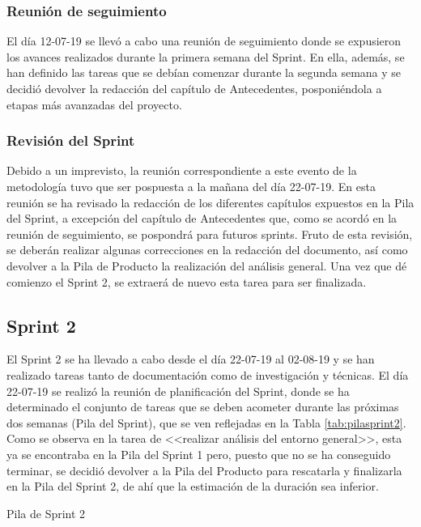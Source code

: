 \subsubsection{Reunión de seguimiento}
El día 12-07-19 se llevó a cabo una reunión de seguimiento donde se expusieron los avances realizados durante la primera semana del Sprint. En ella, además, se han definido las tareas que se debían comenzar durante la segunda semana y se decidió devolver la redacción del capítulo de Antecedentes, posponiéndola a etapas más avanzadas del proyecto.

\subsubsection{Revisión del Sprint}
Debido a un imprevisto, la reunión correspondiente a este evento de la metodología tuvo que ser pospuesta a la mañana del día 22-07-19. En esta reunión se ha revisado la redacción de los diferentes capítulos expuestos en la Pila del Sprint, a excepción del capítulo de Antecedentes que, como se acordó en la reunión de seguimiento, se pospondrá para futuros sprints. Fruto de esta revisión, se deberán realizar algunas correcciones en la redacción del documento, así como devolver a la Pila de Producto la realización del análisis general. Una vez que dé comienzo el Sprint 2, se extraerá de nuevo esta tarea para ser finalizada.

\clearpage

\subsection{Sprint 2}
El Sprint 2 se ha llevado a cabo desde el día 22-07-19 al 02-08-19 y se han realizado tareas tanto de documentación como de investigación y técnicas. El día 22-07-19 se realizó la reunión de planificación del Sprint, donde se ha determinado el conjunto de tareas que se deben acometer durante las próximas dos semanas (Pila del Sprint), que se ven reflejadas en la Tabla \ref{tab:pilasprint2}. Como se observa en la tarea de <<realizar análisis del entorno general>>, esta ya se encontraba en la Pila del Sprint 1 pero, puesto que no se ha conseguido terminar, se decidió devolver a la Pila del Producto para rescatarla y finalizarla en la Pila del Sprint 2, de ahí que la estimación de la duración sea inferior.

\begin{table}[!htbp]
	\centering
	{\small
		
	}
	\caption[Pila de Sprint 2]
	{Pila de Sprint 2}
	\label{tab:pilasprint2}
\end{table}

